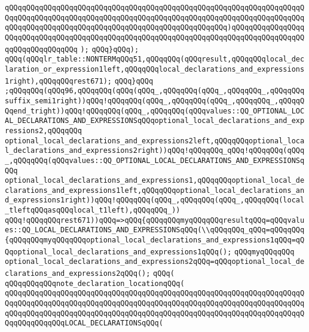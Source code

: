 \verb|qQQqqQQqqQQqqQQqqQQqqQQqqQQqqQQqqQQqqQQqqQQqqQQqqQQqqQQqqQQqqQQqqQQqqQQqqQQqqQQqqQQqqQQqqQQqqQQqqQQqqQQqqQQqqQQqqQQqqQQqqQQqqQQqqQQqqQQqqQQqqQQqqQQqqQQqqQQqqQQqqQQqqQQqqQQqqQQqqQQqqQQqqQQqqQQq)qQQqqQQqqQQqqQQqqQQqqQQqqQQqqQQqqQQqqQQqqQQqqQQqqQQqqQQqqQQqqQQqqQQqqQQqqQQqqQQqqQQqqQQqqQQqqQQqqQQqqQQq|\newline
\verb|);|\newline
\verb|qQQq}qQQq);|\newline
\verb|qQQq(qQQqlr_table::NONTERMqQQq51,qQQqqQQq(qQQqresult,qQQqqQQqlocal_declaration_or_expression1left,qQQqqQQqlocal_declarations_and_expressions1right),qQQqqQQqrest671);|\newline
\verb|qQQq}qQQq|\newline
\verb|;qQQqqQQq(qQQq96,qQQqqQQq(qQQq(qQQq_,qQQqqQQq(qQQq_,qQQqqQQq_,qQQqqQQqsuffix_semi1right))qQQq!qQQqqQQq(qQQq_,qQQqqQQq(qQQq_,qQQqqQQq_,qQQqqQQqend_tright))qQQq!qQQqqQQq(qQQq_,qQQqqQQq(qQQqvalues::QQ_OPTIONAL_LOCAL_DECLARATIONS_AND_EXPRESSIONSqQQqoptional_local_declarations_and_expressions2,qQQqqQQq|\newline
\verb|optional_local_declarations_and_expressions2left,qQQqqQQqoptional_local_declarations_and_expressions2right))qQQq!qQQqqQQq_qQQq!qQQqqQQq(qQQq_,qQQqqQQq(qQQqvalues::QQ_OPTIONAL_LOCAL_DECLARATIONS_AND_EXPRESSIONSqQQq|\newline
\verb|optional_local_declarations_and_expressions1,qQQqqQQqoptional_local_declarations_and_expressions1left,qQQqqQQqoptional_local_declarations_and_expressions1right))qQQq!qQQqqQQq(qQQq_,qQQqqQQq(qQQq_,qQQqqQQq(local_tleftqQQqasqQQqlocal_t1left),qQQqqQQq_))|\newline
\verb|qQQq!qQQqqQQqrest671))qQQq=>qQQq{qQQqqQQqmyqQQqqQQqresultqQQq=qQQqvalues::QQ_LOCAL_DECLARATIONS_AND_EXPRESSIONSqQQq(\\qQQqqQQq_qQQq=qQQqqQQq{qQQqqQQqmyqQQqqQQqoptional_local_declarations_and_expressions1qQQq=qQQqoptional_local_declarations_and_expressions1qQQq();|\newline
\verb|qQQqmyqQQqqQQq|\newline
\verb|optional_local_declarations_and_expressions2qQQq=qQQqoptional_local_declarations_and_expressions2qQQq();|\newline
\verb|qQQq(|\newline
\verb|qQQqqQQqqQQqnote_declaration_locationqQQq(|\newline
\verb|qQQqqQQqqQQqqQQqqQQqqQQqqQQqqQQqqQQqqQQqqQQqqQQqqQQqqQQqqQQqqQQqqQQqqQQqqQQqqQQqqQQqqQQqqQQqqQQqqQQqqQQqqQQqqQQqqQQqqQQqqQQqqQQqqQQqqQQqqQQqqQQqqQQqqQQqqQQqqQQqqQQqqQQqqQQqqQQqqQQqqQQqqQQqqQQqqQQqqQQqqQQqqQQqqQQqqQQqqQQqqQQqLOCAL_DECLARATIONSqQQq(|\newline
